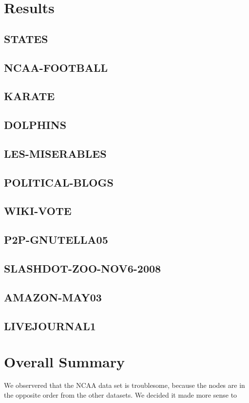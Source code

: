 \documentclass{report}
\begin{document}
\section{Results}
\subsection{STATES}
\subsection{NCAA-FOOTBALL}
\subsection{KARATE}
\subsection{DOLPHINS}
\subsection{LES-MISERABLES}
\subsection{POLITICAL-BLOGS}
\subsection{WIKI-VOTE}
\subsection{P2P-GNUTELLA05}
\subsection{SLASHDOT-ZOO-NOV6-2008}
\subsection{AMAZON-MAY03}
\subsection{LIVEJOURNAL1}

\section{Overall Summary}
We observered that the NCAA data set is troublesome, because the nodes are in the opposite order from the other datasets. We decided it made more sense to 
\end{document}

